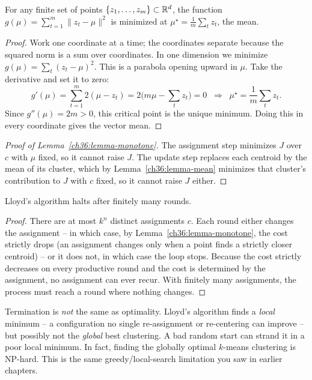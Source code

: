 \begin{lemma}
\label{ch36:lemma-mean}
For any finite set of points $\{z_1,\dots,z_m\}\subset\mathbb{R}^d$, the function
$g(\mu) = \sum_{t=1}^{m}\lVert z_t - \mu\rVert^2$ is minimized at
$\mu^\star = \frac{1}{m}\sum_t z_t$, the mean.
\end{lemma}

\begin{proof}
Work one coordinate at a time; the coordinates separate because the squared
norm is a sum over coordinates. In one dimension we minimize
$g(\mu)=\sum_t (z_t-\mu)^2$. This is a parabola opening upward in $\mu$. Take
the derivative and set it to zero:
\[
  g'(\mu) = \sum_{t=1}^{m} 2(\mu - z_t) = 2\Big(m\mu - \sum_t z_t\Big) = 0
  \;\;\Longrightarrow\;\;
  \mu^\star = \frac{1}{m}\sum_{t} z_t .
\]
Since $g''(\mu) = 2m > 0$, this critical point is the unique minimum. Doing this
in every coordinate gives the vector mean.
\end{proof}

\begin{proof}[Proof of Lemma~\ref{ch36:lemma-monotone}]
The assignment step minimizes $J$ over $c$ with $\mu$ fixed, so it cannot raise
$J$. The update step replaces each centroid by the mean of its cluster, which by
Lemma~\ref{ch36:lemma-mean} minimizes that cluster's contribution to $J$ with
$c$ fixed, so it cannot raise $J$ either.
\end{proof}

\begin{theorem}
\label{ch36:thm-terminate}
Lloyd's algorithm halts after finitely many rounds.
\end{theorem}

\begin{proof}
There are at most $k^n$ distinct assignments $c$. Each round either changes the
assignment -- in which case, by Lemma~\ref{ch36:lemma-monotone}, the cost
strictly drops (an assignment changes only when a point finds a strictly closer
centroid) -- or it does not, in which case the loop stops. Because the cost
strictly decreases on every productive round and the cost is determined by the
assignment, no assignment can ever recur. With finitely many assignments, the
process must reach a round where nothing changes.
\end{proof}

\begin{trapbox}
Termination is \emph{not} the same as optimality. Lloyd's algorithm finds a
\emph{local} minimum -- a configuration no single re-assignment or re-centering
can improve -- but possibly not the \emph{global} best clustering. A bad random
start can strand it in a poor local minimum. In fact, finding the globally
optimal $k$-means clustering is NP-hard. This is the same greedy/local-search
limitation you saw in earlier chapters.
\end{trapbox}

